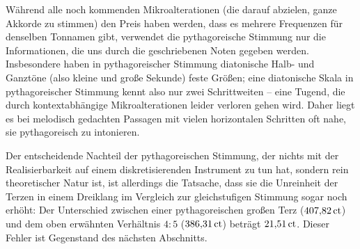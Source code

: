 Während alle noch kommenden Mikroalterationen (die darauf abzielen, ganze
Akkorde zu stimmen) den Preis haben werden, dass es mehrere Frequenzen für
denselben Tonnamen gibt, verwendet die pythagoreische Stimmung nur die
Informationen, die uns durch die geschriebenen Noten gegeben werden.
Insbesondere haben in pythagoreischer Stimmung diatonische Halb- und Ganztöne
(also kleine und große Sekunde) feste Größen; eine diatonische Skala in
pythagoreischer Stimmung kennt also nur zwei Schrittweiten – eine Tugend, die
durch kontextabhängige Mikroalterationen leider verloren gehen wird.  Daher
liegt es bei melodisch gedachten Passagen mit vielen horizontalen Schritten oft
nahe, sie pythagoreisch zu intonieren.

Der entscheidende Nachteil der pythagoreischen Stimmung, der nichts mit der
Realisierbarkeit auf einem diskretisierenden Instrument zu tun hat, sondern rein
theoretischer Natur ist, ist allerdings die Tatsache, dass sie die Unreinheit
der Terzen in einem Dreiklang im Vergleich zur gleichstufigen Stimmung sogar
noch erhöht: Der Unterschied zwischen einer pythagoreischen großen Terz
($407{,}82\,\text{ct}$) und dem oben erwähnten Verhältnis $4:5$
($386{,}31\,\text{ct}$) beträgt $21{,}51\,\text{ct}$. Dieser Fehler ist Gegenstand
des nächsten Abschnitts.

